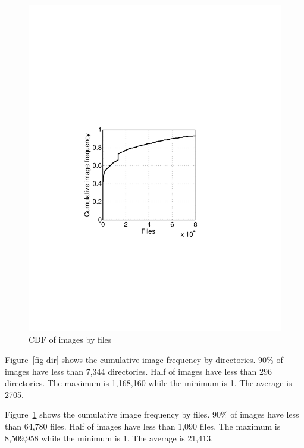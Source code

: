 \begin{figure}
\begin{minipage}{0.23\textwidth}
		\includegraphics[width=1\textwidth]{graphs/file.pdf}
		\caption{CDF of images by files}
		\label{fig-file}
	\end{minipage}
\end{figure}

Figure~\ref{fig-dir} shows the cumulative image frequency by directories. 90\% of images have less than 7,344 directories. Half of images have less than 296 directories. The maximum is 1,168,160 while the minimum is 1. The average is 2705. 

Figure~\ref{fig-file} shows the cumulative image frequency by files. 90\% of images have less than 64,780 files. Half of images have less than 1,090 files. The maximum is 8,509,958 while the minimum is 1. The average is 21,413.
